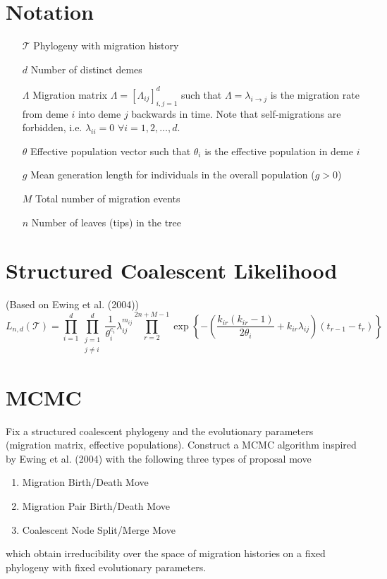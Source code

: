 \documentclass[12pt,a4paper]{article}
\newcommand{\calT}{\mathcal{T}}
\begin{document}
	\section{Notation}
		\begin{itemize}
			\item[$\calT$] Phylogeny with migration history
			\item[$d$] Number of distinct demes
			\item[$\Lambda$] Migration matrix $\Lambda = [\Lambda_{ij}]_{i,j=1}^d$ such that $\Lambda = \lambda_{i \rightarrow j}$ is the migration rate from deme $i$ into deme $j$ backwards in time. Note that self-migrations are forbidden, i.e. $\lambda_{ii} = 0$ $\forall i = 1,2, \dots, d$.
			\item[$\theta$] Effective population vector such that $\theta_i$ is the effective population in deme $i$
			\item[$g$] Mean generation length for individuals in the overall population ($g > 0$)
			\item[$M$] Total number of migration events
			\item[$n$] Number of leaves (tips) in the tree
		\end{itemize}
	
	\section{Structured Coalescent Likelihood}
		(Based on Ewing et al. (2004))
			\begin{equation}
				L_{n,d}(\calT) = \prod_{i=1}^d \prod_{\substack{j=1 \\ j \neq i}}^d \frac{1}{\theta_i^{c_i}} \lambda_{ij}^{m_{ij}} \prod_{r=2}^{2n + M -1} \exp \left\{ - \left( \frac{k_{i r} (k_{i r} - 1)}{2 \theta_i} + k_{i r} \lambda_{i j} \right)(t_{r-1} - t_r) \right\}
			\end{equation}
	
	\section{MCMC}
		Fix a structured coalescent phylogeny and the evolutionary parameters (migration matrix, effective populations). Construct a MCMC algorithm inspired by Ewing et al. (2004) with the following three types of proposal move
			\begin{enumerate}
				\item Migration Birth/Death Move
				\item Migration Pair Birth/Death Move
				\item Coalescent Node Split/Merge Move
			\end{enumerate}
		which obtain irreducibility over the space of migration histories on a fixed phylogeny with fixed evolutionary parameters.
		
\end{document}

